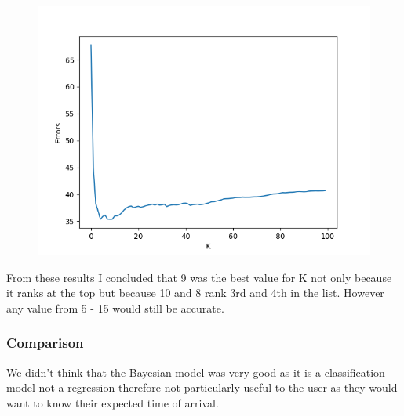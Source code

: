 \documentclass[11pt]{article}
\begin{document}
	\begin{figure}[!htb]
		\centering
		\begin{minipage}{.8\textwidth}
			\centering
			\includegraphics[width=.8\linewidth]{Resources/PartTwo/searchingForK_20220110_065714.png}
			\label{Img:KSearch}
		\end{minipage}%
		\begin{minipage}{.2\textwidth}
			\centering
			\label{Img:KSearchRaw}
		\end{minipage}
	\end{figure}
	
	From these results I concluded that 9 was the best value for K not only because it ranks at the top but because 10 and 8 rank 3rd and 4th in the list. However any value from 5 - 15 would still be accurate.
	\subsubsection{Comparison}
	We didn't think that the Bayesian model was very good as it is a classification model not a regression therefore not particularly useful to the user as they would want to know their expected time of arrival.
	
	
\end{document}
